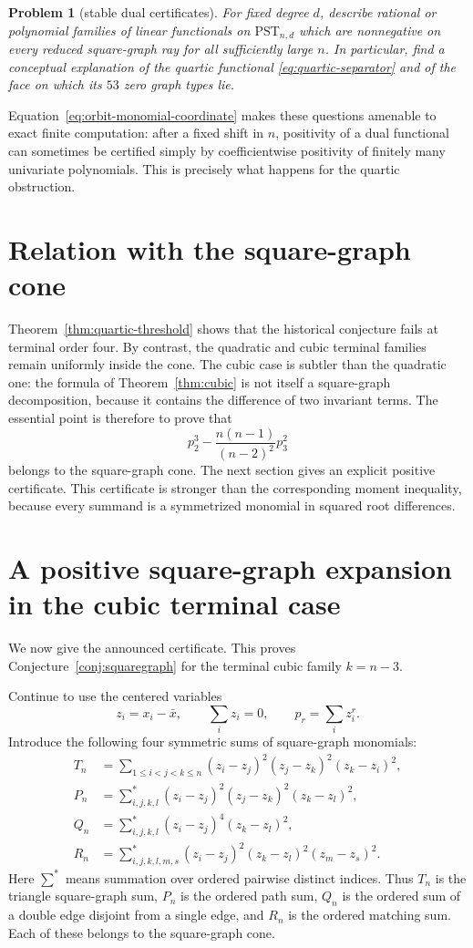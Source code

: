 \documentclass[11pt]{amsart}
\numberwithin{equation}{section}
\newtheorem{problem}[theorem]{Problem}
\begin{document}
\begin{problem}[stable dual certificates]\label{prob:dual-certificates}
For fixed degree $d$, describe rational or polynomial families of linear
functionals on $\mathrm{PST}_{n,d}$ which are nonnegative on every reduced
square-graph ray for all sufficiently large $n$.  In particular, find a
conceptual explanation of the quartic functional
\eqref{eq:quartic-separator} and of the face on which its $53$ zero graph types
lie.
\end{problem}

Equation~\eqref{eq:orbit-monomial-coordinate} makes these questions amenable
to exact finite computation: after a fixed shift in $n$, positivity of a dual
functional can sometimes be certified simply by coefficientwise positivity of
finitely many univariate polynomials.  This is precisely what happens for the
quartic obstruction.

\section{Relation with the square-graph cone}

Theorem~\ref{thm:quartic-threshold} shows that the historical conjecture fails
at terminal order four.  By contrast, the quadratic and cubic terminal
families remain uniformly inside the cone.  The cubic case is subtler than the
quadratic one: the formula of Theorem~\ref{thm:cubic} is not itself a
square-graph decomposition, because it contains the difference of two
invariant terms.  The essential point is therefore to prove that
\[
        p_2^3-\frac{n(n-1)}{(n-2)^2}p_3^2
\]
belongs to the square-graph cone.  The next section gives an explicit positive
certificate.  This certificate is stronger than the corresponding moment
inequality, because every summand is a symmetrized monomial in squared root
differences.


\section{A positive square-graph expansion in the cubic terminal case}

We now give the announced certificate.  This proves
Conjecture~\ref{conj:squaregraph} for the terminal cubic family
$k=n-3$.

Continue to use the centered variables
\[
 z_i=x_i-\bar x,
 \qquad \sum_i z_i=0,
 \qquad p_r=\sum_i z_i^r .
\]
Introduce the following four symmetric sums of square-graph monomials:
\[
\begin{aligned}
T_n&=\sum_{1\le i<j<k\le n}
 (z_i-z_j)^2(z_j-z_k)^2(z_k-z_i)^2,\\
P_n&=\sum_{i,j,k,l}^{*}
 (z_i-z_j)^2(z_j-z_k)^2(z_k-z_l)^2,\\
Q_n&=\sum_{i,j,k,l}^{*}
 (z_i-z_j)^4(z_k-z_l)^2,\\
R_n&=\sum_{i,j,k,l,m,s}^{*}
 (z_i-z_j)^2(z_k-z_l)^2(z_m-z_s)^2.
\end{aligned}
\]
Here $\sum^*$ means summation over ordered pairwise distinct indices.  Thus
$T_n$ is the triangle square-graph sum, $P_n$ is the ordered path sum,
$Q_n$ is the ordered sum of a double edge disjoint from a single edge, and
$R_n$ is the ordered matching sum.  Each of these belongs to the square-graph
cone.
\end{document}
